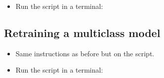 \documentclass[letterpaper,10pt,english]{sphinxmanual}
\begin{document}
\begin{itemize}
\begin{description}
\begin{itemize}
\item {} 
\sphinxAtStartPar
{}: device to use for training. Default value is ‘cpu:0’.

\item {} 
\sphinxAtStartPar
{}: maximum number of instances in the ground truth. Default value is 100.

\item {} 
\sphinxAtStartPar
{}: maximum number of instances in the detections. Default value is 35.

\item {} 
\sphinxAtStartPar
in the {\color{red}\bfseries{}\textasciigrave{}\textasciigrave{}}CustomDataset\textasciigrave{}\textasciigrave{}class, modify or add lines :

\end{itemize}

\end{description}

\item {} 
\sphinxAtStartPar
Run the script in a terminal:

\end{itemize}

\begin{sphinxVerbatim}[commandchars=\\\{\}]
 
\end{sphinxVerbatim}


\subsection{Retraining a multi\sphinxhyphen{}class model}
\label{\detokenize{index:retraining-a-multi-class-model}}\begin{itemize}
\item {} 
\sphinxAtStartPar
Same instructions as before but on the  script.

\item {} 
\sphinxAtStartPar
Run the script in a terminal:

\end{itemize}

\begin{sphinxVerbatim}[commandchars=\\\{\}]
 
\end{sphinxVerbatim}
\end{document}
